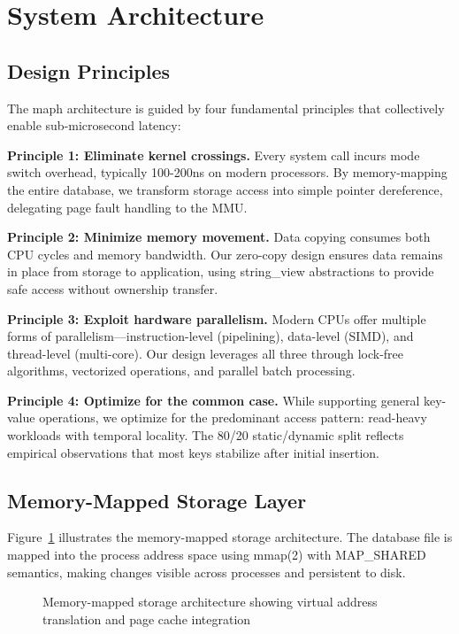\documentclass[10pt,conference]{IEEEtran}
\begin{document}
\section{System Architecture}
\label{sec:architecture}

\subsection{Design Principles}

The maph architecture is guided by four fundamental principles that collectively enable sub-microsecond latency:

\textbf{Principle 1: Eliminate kernel crossings.} Every system call incurs mode switch overhead, typically 100-200ns on modern processors. By memory-mapping the entire database, we transform storage access into simple pointer dereference, delegating page fault handling to the MMU.

\textbf{Principle 2: Minimize memory movement.} Data copying consumes both CPU cycles and memory bandwidth. Our zero-copy design ensures data remains in place from storage to application, using string\_view abstractions to provide safe access without ownership transfer.

\textbf{Principle 3: Exploit hardware parallelism.} Modern CPUs offer multiple forms of parallelism—instruction-level (pipelining), data-level (SIMD), and thread-level (multi-core). Our design leverages all three through lock-free algorithms, vectorized operations, and parallel batch processing.

\textbf{Principle 4: Optimize for the common case.} While supporting general key-value operations, we optimize for the predominant access pattern: read-heavy workloads with temporal locality. The 80/20 static/dynamic split reflects empirical observations that most keys stabilize after initial insertion.

\subsection{Memory-Mapped Storage Layer}

Figure~\ref{fig:mmap-architecture} illustrates the memory-mapped storage architecture. The database file is mapped into the process address space using mmap(2) with MAP\_SHARED semantics, making changes visible across processes and persistent to disk.

\begin{figure}[htbp]
\centerline{}
\caption{Memory-mapped storage architecture showing virtual address translation and page cache integration}
\label{fig:mmap-architecture}
\end{figure}
\end{document}

